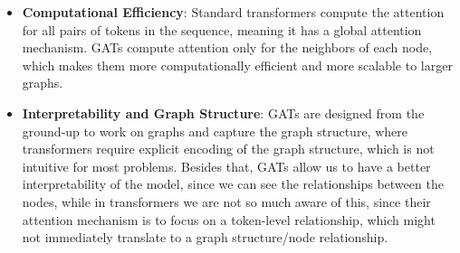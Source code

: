 \documentclass{article}
\begin{document}
\begin{itemize}
    \item \textbf{Computational Efficiency}: Standard transformers compute the attention for all pairs of tokens in the sequence, meaning it has a global attention mechanism.
GATs compute attention only for the neighbors of each node, which makes them more computationally efficient and more scalable to larger graphs.
    \item \textbf{Interpretability and Graph Structure}: GATs are designed from the ground-up to work on graphs and capture the graph structure, where transformers require explicit encoding of the graph structure,
which is not intuitive for most problems. Besides that, GATs allow us to have a better interpretability of the model, since we can see the relationships between the nodes, while in transformers
we are not so much aware of this, since their attention mechanism is to focus on a token-level relationship, which might
not immediately translate to a graph structure/node relationship.
\end{itemize}






























\newpage

 
\end{document}

